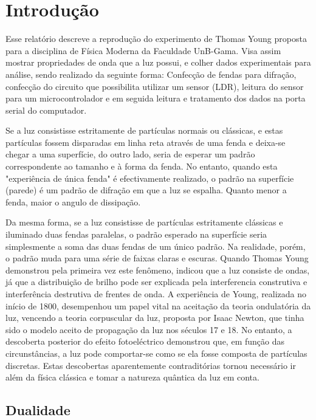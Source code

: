 \section{Introdução}\label{intro}
Esse relatório descreve a reprodução do experimento de Thomas Young proposta para a disciplina de Física Moderna da Faculdade UnB-Gama. Visa assim mostrar propriedades de onda que a luz possui, e colher dados experimentais para análise, sendo realizado da seguinte forma: Confecção de fendas para difração, confecção do circuito que possibilita utilizar um sensor (LDR), leitura do sensor para um microcontrolador e em seguida leitura e tratamento dos dados na porta serial do computador.

Se a luz consistisse estritamente de  partículas  normais ou clássicas, e estas partículas fossem disparadas em linha reta através de uma fenda e deixa-se chegar a uma superfície, do outro lado, seria de esperar um padrão correspondente ao tamanho e à forma da fenda. No entanto, quando esta "experiência de única fenda" é efectivamente realizado, o padrão na superfície (parede) é um padrão de difração em que a luz se espalha. Quanto menor a fenda, maior o angulo de dissipação.

Da mesma forma, se a luz consistisse de partículas estritamente clássicas e iluminado duas fendas paralelas, o padrão esperado na superfície seria simplesmente a soma das duas fendas de um único padrão. Na realidade, porém, o padrão muda para uma série de faixas claras e escuras. Quando Thomas Young demonstrou pela primeira vez este fenômeno, indicou que a luz consiste de ondas, já que a distribuição de brilho pode ser explicada pela interferencia construtiva e interferência destrutiva de frentes de onda. A experiência de Young, realizada no início de 1800, desempenhou um papel vital na aceitação da teoria ondulatória da luz, vencendo a teoria corpuscular da luz, proposta por Isaac Newton, que tinha sido o modelo aceito de propagação da luz nos séculos 17 e 18. No entanto, a descoberta posterior do efeito fotoeléctrico demonstrou que, em função das circunstâncias, a luz pode comportar-se como se ela fosse composta de partículas discretas. Estas descobertas aparentemente contraditórias tornou necessário ir além da física clássica e tomar a natureza quântica da luz em conta.

\subsection{Dualidade}\label{dualidade}

